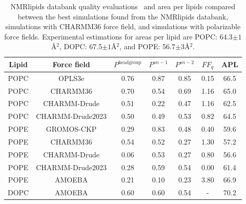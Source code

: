 \documentclass[journal=jacsat,manuscript=article,layout=singlecolumn]{achemso}
\begin{document}
\begin{table}[]
    \centering
    \begin{tabular}{c c c c c c c}
        Lipid & Force field & $P^{\mathrm{headgroup}}$ & $P^{sn-1}$ & $P^{sn-2}$ & $FF_{q}$ & APL \\
        \hline
        POPC & OPLS3e       & 0.76 & 0.87 & 0.85 & 0.15 & 66.5\\
        POPC & CHARMM36     & 0.70 & 0.54 & 0.69 & 1.16 & 65.0\\
        POPC & CHARMM-Drude & 0.51 & 0.22 & 0.47 & 1.16 & 62.5\\
        POPC & CHARMM-Drude2023 & 0.50 & 0.49 & 0.53 & 0.82 & 64.5\\
        \hline
        POPE & GROMOS-CKP & 0.29 & 0.83 & 0.48 & 0.40 & 59.6\\
        POPE & CHARMM36   & 0.54 & 0.52 & 0.27 & 1.30 & 57.2 \\
        POPE & CHARMM-Drude & 0.06 & 0.53 & 0.27 & 0.80 & 56.6  \\
        POPE & CHARMM-Drude2023 & 0.28 & 0.59 & 0.54 & 0.00 & 61.4  \\
        POPE & AMOEBA & 0.21 & 0.10 & 0.23 & 3.80 & 66.9\\
        \hline
        DOPC & AMOEBA & 0.60 & 0.60 & 0.54 & - & 70.2\\
    \end{tabular}
    \caption{NMRlipids databank quality evaluations~\cite{Databank} and area per lipids compared between the best simulations found from the NMRlipids databank, simulations with CHARMM36 force field, and simulations with polarizable force fields. Experimental estimations for areas per lipid are POPC: 64.3$\pm1$\AA$^{2}$\cite{kucerka2011}, DOPC: 67.5$\pm1$\AA$^{2}$\cite{kucerka2008}, and POPE: 56.7$\pm$3\AA$^{2}$\cite{Rickeard2020}.}
    \label{tab:my_label}
\end{table}

\end{document}
